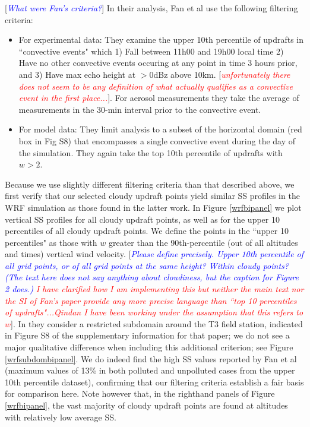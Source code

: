 \documentclass{article}
\newcommand{\drcomm}[1]{\textcolor{blue}{\textit{#1}}}
\newcommand{\klcomm}[1]{\textcolor{red}{\textit{#1}}}
\begin{document}
[\drcomm{What were Fan's criteria?}] In their analysis, Fan et al use the following filtering criteria:
\begin{itemize}
	\item For experimental data: They examine the upper 10th percentile of updrafts in ``convective events" which 1) Fall between 11h00 and 19h00 local time 2) Have no other convective events occuring at any point in time 3 hours prior, and 3) Have max echo height at $>$0dBz above 10km. [\klcomm{unfortunately there does not seem to be any definition of what actually qualifies as a convective event in the first place...}]. For aerosol measurements they take the average of measurements in the 30-min interval prior to the convective event.
	\item For model data: They limit analysis to a subset of the horizontal domain (red box in Fig S8) that encompasses a single convective event during the day of the simulation. They again take the top 10th percentile of updrafts with $w>2$. 
\end{itemize}

Because we use slightly different filtering criteria than that described above, we first verify that our selected cloudy updraft points yield similar SS profiles in the WRF simulation as those found in the latter work. In Figure \ref{wrfbipanel} we plot vertical SS profiles for all cloudy updraft points, as well as for the upper 10 percentiles of all cloudy updraft points. We define the points in the ``upper 10 percentiles" as those with $w$ greater than the 90th-percentile (out of all altitudes and times) vertical wind velocity. [\drcomm{Please define precisely. Upper 10th percentile of all grid points, or of all grid points at the same height? Within cloudy points? (The text here does not say anything about cloudiness, but the caption for Figure 2 does.)} \klcomm{I have clarified how I am implementing this but neither the main text nor the SI of Fan's paper provide any more precise language than ``top 10 percentiles of updrafts"...Qindan I have been working under the assumption that this refers to $w$}]. In \cite{Fan2018} they consider a restricted subdomain around the T3 field station, indicated in Figure S8 of the supplementary information for that paper; we do not see a major qualitative difference when including this additional criterion; see Figure \ref{wrfsubdombipanel}. We do indeed find the high SS values reported by Fan et al (maximum values of 13\% in both polluted and unpolluted cases from the upper 10th percentile dataset), confirming that our filtering criteria establish a fair basis for comparison here. Note however that, in the righthand panels of Figure \ref{wrfbipanel}, the vast majority of cloudy updraft points are found at altitudes with relatively low average SS.
\end{document}
